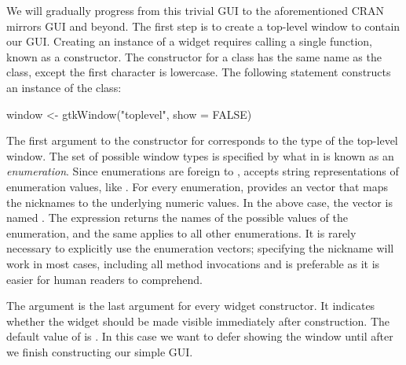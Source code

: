 \documentclass[article,shortnames]{jss}
\begin{document}
We will gradually 
progress from this trivial GUI to the aforementioned CRAN mirrors GUI
and beyond.
The first step is to create a top-level window to contain our GUI.
Creating an instance of a  widget requires calling a single
function, known as a constructor. The constructor for a class has the
same name as the class, except the first character is lowercase. The
following statement constructs an instance of the
 class:
\begin{Code}
window <- gtkWindow("toplevel", show = FALSE)
\end{Code}

The first argument to the constructor for  corresponds
to the type of the top-level window. The set of possible window types
is specified by what in  is known as an
\emph{enumeration}. Since enumerations are foreign to ,
accepts string representations of enumeration values, like
. For every  enumeration, 
provides
an  vector that maps the nicknames to the underlying
numeric values.  In the above case, the vector is named
. The expression 
returns the names of the possible values of the 
enumeration, and the same applies to all other enumerations. It is
rarely necessary to explicitly use the
enumeration vectors; specifying the nickname will work in most cases,
including all method invocations and is preferable as it is easier for
human readers to comprehend. 





The  argument is the last argument for every widget
constructor. It indicates whether the widget should be made visible
immediately after construction.  The default value of  is
. In this case we want to defer showing the window until
after we finish constructing our simple GUI.
\end{document}
